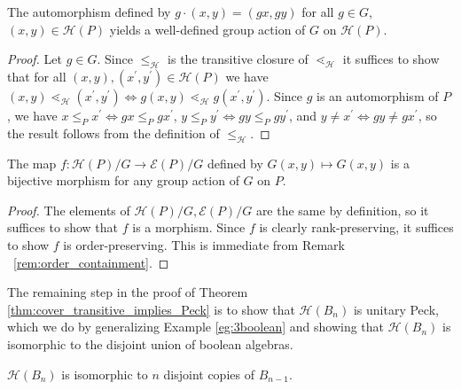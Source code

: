 \documentclass[smallextended]{svjour3}       %
\numberwithin{equation}{section}
\renewcommand{\iff}{\Leftrightarrow}
\begin{document}
\begin{lemma}
\label{lem:G_action_on_HP}
The automorphism defined by $g\cdot (x, y)= (gx, gy)$ for all $g\in G$, $(x, y)\in \mathcal{H}(P)$ yields a well-defined group action of $G$ on $\mathcal{H}(P)$.
\end{lemma}

\begin{proof}
Let $g\in G$.  Since $\le_{\mathcal{H}}$ is the transitive closure of $\lessdot_{\mathcal{H}}$ it suffices to show that for all $(x,y),(x^\prime,y^\prime)\in \mathcal{H}(P)$ we have $(x, y) \lessdot_{\mathcal H} (x^\prime,y^\prime) \iff g(x, y) \lessdot_{\mathcal H} g(x^\prime, y^\prime)$.  Since $g$ is an automorphism of $P$, we have $x\le_P x^\prime \iff gx\le_P gx^\prime$, $y\le_P y^\prime \iff gy\le_P gy^\prime$, and $y\neq x^\prime \iff gy\neq gx^\prime$, so the result follows from the definition of $\le_{\mathcal{H}}$.
\end{proof}

\begin{lemma}
\label{lem:bijection_h_f}
The map $f\colon\mathcal H(P)/G \rightarrow \mathcal E(P)/G$ defined by $G(x,y) \mapsto G(x,y)$ is a bijective morphism for any group action of $G$ on $P$.
\end{lemma}

\begin{proof}
The elements of $\mathcal H(P)/G,\mathcal E(P)/G$ are the same by definition, so it suffices to show that $f$ is a morphism. Since $f$ is clearly rank-preserving, it suffices to show $f$ is order-preserving. This is immediate from Remark ~\ref{rem:order_containment}.
\end{proof}

The remaining step in the proof of Theorem \ref{thm:cover_transitive_implies_Peck} is to show that $\mathcal{H}(B_n)$ is unitary Peck, which we do by generalizing Example \ref{eg:3boolean} and showing that $\mathcal{H}(B_n)$ is isomorphic to the disjoint union of boolean algebras.

\begin{proposition}\label{prop:computing_HBn}
$\mathcal{H}(B_n)$ is isomorphic to $n$ disjoint copies of $B_{n-1}$.
\end{proposition}
\end{document}

